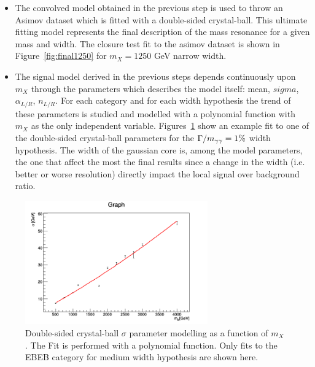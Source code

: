 \begin{itemize}
\item The convolved model obtained in the previous step is used to throw an Asimov dataset which is fitted with a double-sided crystal-ball. This ultimate fitting model represents the final description of the mass resonance for a given mass and width. The closure test fit to the asimov dataset is shown in Figure~\ref{fig:final1250} for $m_X=1250$ GeV  narrow width.

\item The signal model derived in the previous steps depends continuously upon  $m_X$ through the parameters which describes the model itself: mean, $sigma$, $\alpha_{L/R}$, $n_{L/R}$. For each category and for each width hypothesis the trend of these parameters is studied and modelled with a polynomial function with $m_X$ as the only independent variable. Figures~\ref{fig:fitmean} show an example fit to one of the  double-sided crystal-ball parameters for the $\Gamma / m_{\gamma\gamma} = 1\%$ width hypothesis. The width of the gaussian core is, among the model parameters, the one that affect the most the final results since
  a change in the width (i.e. better or worse resolution) directly impact the local signal over background ratio.

\end{itemize}
  
\begin{figure}[!h]
\begin{center}
  \includegraphics[width=0.7\textwidth]{figures/diphotons/sigmaVsMass_EBEB016.png}
 \caption{Double-sided crystal-ball $\sigma$ parameter modelling as a function of $m_X$. The Fit is performed with a polynomial function. Only fits to the EBEB category for medium width hypothesis are shown here.}
\label{fig:fitmean}
\end{center}
\end{figure}

